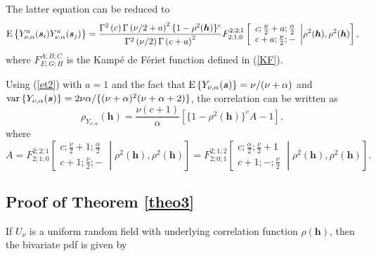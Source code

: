 \documentclass[times,sort&compress,3p]{elsarticle}
\theoremstyle{plain}%
\theoremstyle{definition}
\def\ss{\bm{s}}
\def\EE{{\rm E}}
\def\VV{{\rm var}}
\def\hh{\bm{h}}
\begin{document}
The latter equation can be reduced to
\begin{equation}\label{et2}
\EE\left\{Y_{\nu,\alpha}^a(\ss_i)Y_{\nu,\alpha}^a(\ss_j)\right\}= \frac{\Gamma^2\left(c\right)\Gamma\left(\nu/2+a\right)^2 \{1-\rho^2(\hh)\}^{c}}
{\Gamma^2\left(\nu/2\right)\Gamma\left(c+a\right)^2}
F_{2;1;0}^{2;2;1}\left[ \begin{array}{c}
                                  c;\frac{\nu}{2}+a;\frac{\alpha}{2}\\
                                  c+a;\frac{\nu}{2};-
                                \end{array}\middle\vert \rho^{2}(\hh),\rho^{2}(\hh)\right],
\end{equation}
where $F_{E;G;H}^{A;B;C}$ is the Kampé de Fériet function defined in (\ref{KF}).


Using (\ref{et2}) with $a=1$ and the fact that $\EE\left\{Y_{\nu,\alpha}(\ss)\right\}=\nu/(\nu+\alpha)$ and $\VV\left\{Y_{\nu,\alpha}(\ss)\right\}=2\nu \alpha/\{(\nu+\alpha)^2(\nu+\alpha+2)\}$, the correlation can be written as
\begin{equation*}
\rho_{Y_{\nu,\alpha}}(\hh)=\frac{\nu (c+1)}{\alpha}\left[\{1-\rho^2(\hh)\}^{c}A-1\right],
\end{equation*}
where
\begin{equation*}
A=F_{2;1;0}^{2;2;1}\left[ \begin{array}{c}
                                  c;\frac{\nu}{2}+1;\frac{\alpha}{2}\\
                                  c+1;\frac{\nu}{2};-
                                \end{array}\middle\vert \rho^{2}(\hh),\rho^{2}(\hh)\right]=
F_{2;0;1}^{2;1;2}\left[ \begin{array}{c}
                                  c;\frac{\alpha}{2};\frac{\nu}{2}+1\\
                                  c+1;-;\frac{\nu}{2}
                                \end{array}\middle\vert \rho^{2}(\hh),\rho^{2}(\hh)\right].
\end{equation*}


\subsection*{Proof of Theorem \ref{theo3}}\label{proof_theo3}
\noindent If $U_{\nu}$ is  a uniform random field with underlying correlation function $\rho(\hh)$, then the bivariate pdf  is given by
\end{document}
